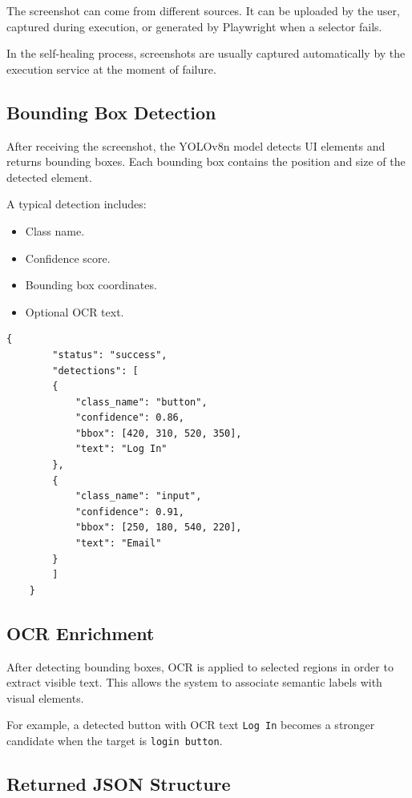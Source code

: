 The screenshot can come from different sources. It can be uploaded by the user, captured during execution, or generated by Playwright when a selector fails.

In the self-healing process, screenshots are usually captured automatically by the execution service at the moment of failure.

\subsection{Bounding Box Detection}
\label{subsec:bounding_box_detection}

After receiving the screenshot, the YOLOv8n model detects UI elements and returns bounding boxes. Each bounding box contains the position and size of the detected element.

A typical detection includes:

\begin{itemize}
	\item Class name.
	\item Confidence score.
	\item Bounding box coordinates.
	\item Optional OCR text.
\end{itemize}

\begin{lstlisting}[caption={Simplified vision detection response}, label={lst:vision_detection_response}]
	{
		"status": "success",
		"detections": [
		{
			"class_name": "button",
			"confidence": 0.86,
			"bbox": [420, 310, 520, 350],
			"text": "Log In"
		},
		{
			"class_name": "input",
			"confidence": 0.91,
			"bbox": [250, 180, 540, 220],
			"text": "Email"
		}
		]
	}
\end{lstlisting}

\subsection{OCR Enrichment}
\label{subsec:ocr_enrichment}

After detecting bounding boxes, OCR is applied to selected regions in order to extract visible text. This allows the system to associate semantic labels with visual elements.

For example, a detected button with OCR text \texttt{Log In} becomes a stronger candidate when the target is \texttt{login button}.

\subsection{Returned JSON Structure}
\label{subsec:vision_json_structure}

